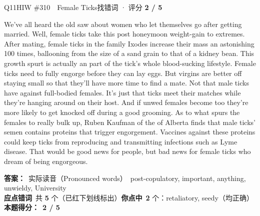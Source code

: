 \begin{qblock}{Q11\quad HIW \#310\ \ Female Ticks}{找错词 · 评分 \textcolor{cAccent}{\bfseries 2 / 5}}
\begin{promptbox}
We've all heard the old saw about women who let themselves go after getting married. Well, female ticks take this post honeymoon weight-gain to extremes. After mating, female ticks in the family Ixodes increase their mass an astonishing 100 times, ballooning from the size of a sand grain to that of a kidney bean. This  growth spurt is actually an  part of the tick's whole blood-sucking lifestyle. Female ticks need to fully engorge before they can lay eggs. But virgins are better off staying small so that they'll have more time to find a mate. Not that male ticks have  against full-bodied females. It's just that ticks meet their matches while they're hanging around on their host. And if unwed females become too  they're more likely to get knocked off during a good grooming. As to what spurs the females to really bulk up, Ruben Kaufman of the  of Alberta finds that male ticks' semen contains proteins that trigger engorgement. Vaccines against these proteins could keep ticks from reproducing and transmitting infections such as Lyme disease. That would be good news for people, but bad news for female ticks who dream of being engorgeous.
\end{promptbox}
\par\smallskip
\textbf{答案：}\ 实际读音（Pronounced words）\ {\color{cFix}post-copulatory, important, anything, unwieldy, University}\\
\textbf{应点错词}\ 共 \textbf{5} 个（已红下划线标出）\qquad\textbf{你点中}\ \textbf{2} 个：retaliatory, seedy（均正确）\\[2pt]\textbf{本题得分：}\ {\color{cAccent}\bfseries 2 / 5}
\end{qblock}

